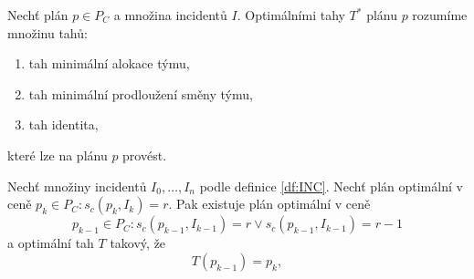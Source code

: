 \begin{definice}\label{df:optimalniTahy}
  Nechť plán $p \in P_C$ a množina incidentů $I$.
  Optimálními tahy $T^*$ plánu $p$ rozumíme množinu tahů:
  \begin{enumerate}
  \item
    tah minimální alokace týmu,
  \item
    tah minimální prodloužení směny týmu,
  \item
    tah identita,
  \end{enumerate}
  které lze na plánu $p$ provést.
\end{definice}

\begin{veta}\label{veta:optimalniTahy}
  Nechť množiny incidentů $I_0, \dots, I_n$ podle definice \ref{df:INC}.
  Nechť plán optimální v ceně $p_k \in P_C \colon s_c(p_k, I_k) = r$.
  Pak existuje plán optimální v ceně
  \begin{equation*}
    p_{k-1} \in P_C \colon s_c(p_{k-1}, I_{k-1}) = r \lor s_c(p_{k-1}, I_{k-1}) = r - 1
  \end{equation*}
  a optimální tah $T$ takový, že
  \begin{equation*}
    T(p_{k-1}) = p_k,
  \end{equation*}
\end{veta}
